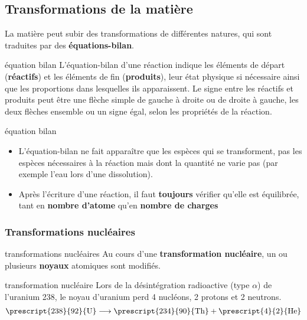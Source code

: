 \documentclass[../main/main.tex]{subfiles}
\begin{document}
\subsection{Transformations de la matière}

La matière peut subir des transformations de différentes natures, qui sont
traduites par des \textbf{équations-bilan}.

\begin{tcbraster}[raster columns=2, raster equal height=rows]
    \begin{defi}[label=def:eqbil, heart]{équation bilan}
        L'équation-bilan d'une réaction indique les éléments de
        départ (\textbf{réactifs}) et les éléments de fin (\textbf{produits}),
        leur état physique si nécessaire ainsi que les proportions dans
        lesquelles ils apparaissent. Le signe entre les réactifs et produits
        peut être une flèche simple de gauche à droite ou de droite à gauche,
        les deux flèches ensemble ou un signe égal, selon les propriétés de la
        réaction.
    \end{defi}
    \begin{ror}[label=rema:eqbil]{équation bilan}
        \begin{itemize}
            \item L'équation-bilan ne fait apparaître que les espèces qui se
                transforment, pas les espèces nécessaires à la réaction
                mais dont la quantité ne varie pas (par
                exemple l'eau lors d'une dissolution).
            \item Après l'écriture d'une réaction, il faut \textbf{toujours}
                vérifier qu'elle est équilibrée, tant en \textbf{nombre d'atome}
                qu'en \textbf{nombre de charges}
        \end{itemize}
    \end{ror}
\end{tcbraster}

\subsubsection{Transformations nucléaires}

\begin{tcbraster}[raster columns=2, raster equal height=rows]
    \begin{defi}[label=def:transnuc]{transformations nucléaires}
        Au cours d'une \textbf{transformation nucléaire}, un ou plusieurs
        \textbf{noyaux} atomiques sont modifiés.
    \end{defi}
    \begin{exem}[label=exem:transnuc]{transformation nucléaire}
        Lors de la désintégration radioactive (type $\alpha$) de l'uranium 238,
        le noyau d'uranium perd 4 nucléons, 2 protons et 2 neutrons.
        \begin{equation*}
            \prescript{238}{92}{\mathrm{U}}
            \longrightarrow 
            \prescript{234}{90}{\mathrm{Th}} + \prescript{4}{2}{\mathrm{He}}
        \end{equation*}
    \end{exem}
\end{tcbraster}
\end{document}
